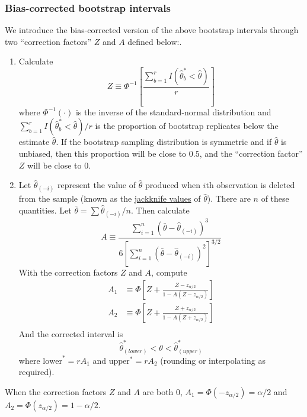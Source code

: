 \subsubsection*{Bias-corrected bootstrap intervals}
We introduce the bias-corrected version of the above bootstrap intervals through two ``correction factors'' $Z$ and $A$ defined below:.

\begin{enumerate}
	\item Calculate 
	$$
	Z \equiv \Phi^{-1}\left[\frac{\sum_{b = 1}^r I(\hat{\theta}_b^* < \hat{\theta})}{r}\right]
	$$
	where $\Phi^{-1}(\cdot)$ is the inverse of the standard-normal distribution and $\sum_{b = 1}^r I(\hat{\theta}_b^* < \hat{\theta})/{r}$ is the proportion of bootstrap replicates below the estimate $\hat{\theta}$.  If the bootstrap sampling distribution is symmetric and if $\hat{\theta}$ is unbiased, then this proportion will be close to $0.5$, and the ``correction factor'' $Z$ will be close to $0$.
	\item Let $\hat{\theta}_{(-i)}$ represent the value of $\hat{\theta}$ produced when $i$th observation is deleted from the sample (known as the \underline{jackknife values} of $\hat{\theta}$).
	There are $n$ of these quantities.
	Let $\bar{\theta} = \sum \hat{\theta}_{(-i)} / n$.  Then calculate
	$$
	A \equiv \frac{\sum_{i = 1}^{n}(\bar{\theta} - \hat{\theta}_{(-i)})^3}{ 6 \left[\sum_{i = 1}^{n}(\bar{\theta} - \hat{\theta}_{(-i)})^2\right]^{3/2}}
	$$
	With the correction factors $Z$ and $A$, compute 
	$$
	\begin{aligned}
 		A_1 &\equiv \Phi\left[Z + \frac{Z - z_{\alpha / 2}}{1 - A(Z - z_{\alpha / 2})}\right]\\
 		A_2 &\equiv \Phi\left[Z + \frac{Z + z_{\alpha / 2}}{1 - A(Z + z_{\alpha / 2})}\right]\\
	\end{aligned}
	$$
	And the corrected interval is
	$$
	\hat{\theta}_{(lower)}^* < \theta < \hat{\theta}_{(upper)}^*
	$$
	where $\mbox{lower}^* = r A_1$ and $\mbox{upper}^* = r A_2$ (rounding or interpolating as required).
\end{enumerate}

When the correction factors $Z$ and $A$ are both $0$, $A_1 = \Phi(-z_{\alpha/2}) = \alpha / 2$ and $A_2 = \Phi(z_{\alpha/2}) = 1 - \alpha / 2$.

